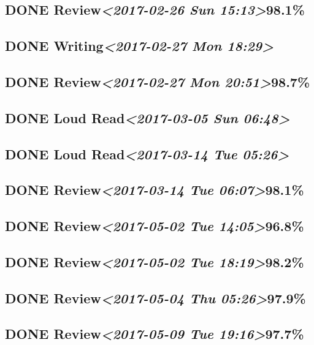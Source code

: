 \documentclass[11pt]{ctexart}
\begin{document}
\subsection{{\bfseries\sffamily DONE} Review\textit{<2017-02-26 Sun 15:13>}98.1\%}
\label{sec:org851b91a}
\subsection{{\bfseries\sffamily DONE} Writing\textit{<2017-02-27 Mon 18:29>}}
\label{sec:org18eeb95}
\subsection{{\bfseries\sffamily DONE} Review\textit{<2017-02-27 Mon 20:51>}98.7\%}
\label{sec:orgdcc6a7a}
\subsection{{\bfseries\sffamily DONE} Loud Read\textit{<2017-03-05 Sun 06:48>}}
\label{sec:org5b95202}
\subsection{{\bfseries\sffamily DONE} Loud Read\textit{<2017-03-14 Tue 05:26>}}
\label{sec:org916b977}
\subsection{{\bfseries\sffamily DONE} Review\textit{<2017-03-14 Tue 06:07>}98.1\%}
\label{sec:org9c42fa7}
\subsection{{\bfseries\sffamily DONE} Review\textit{<2017-05-02 Tue 14:05>}96.8\%}
\label{sec:org255bdc2}
\subsection{{\bfseries\sffamily DONE} Review\textit{<2017-05-02 Tue 18:19>}98.2\%}
\label{sec:orga82f400}
\subsection{{\bfseries\sffamily DONE} Review\textit{<2017-05-04 Thu 05:26>}97.9\%}
\label{sec:org16d071a}
\subsection{{\bfseries\sffamily DONE} Review\textit{<2017-05-09 Tue 19:16>}97.7\%}
\label{sec:org1ac17b3}
\end{document}
